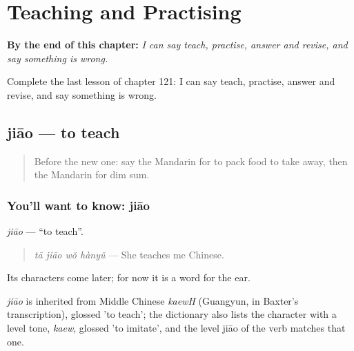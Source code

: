
\chapter{Teaching and Practising}
\label{ch:zh-teaching-and-practising}

\begin{chapteropening}
\textbf{By the end of this chapter:} \emph{I can say teach, practise, answer and revise, and say something is wrong.}

Complete the last lesson of chapter 121: I can say teach, practise, answer and revise, and say something is wrong.
\end{chapteropening}

\section[jiāo]{jiāo — to teach}

\label{lesson:ZH-C121-jiao-teach}



\begin{quote}
Before the new one: say the Mandarin for to pack food to take away, then the Mandarin for dim sum.
\end{quote}

\subsection*{You'll want to know: jiāo}
\emph{jiāo} — \textquotedblleft{}to teach\textquotedblright{}.

\begin{quote}
\emph{tā jiāo wǒ hànyǔ} — She teaches me Chinese.
\end{quote}

Its characters come later; for now it is a word for the ear.

\begin{cousinweb}
\emph{jiāo} is inherited from Middle Chinese \emph{kaewH} (Guangyun, in Baxter's transcription), glossed 'to teach'; the dictionary also lists the character with a level tone, \emph{kaew}, glossed 'to imitate', and the level jiāo of the verb matches that one.
\end{cousinweb}

